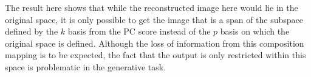 \documentclass[12pt]{article}
\begin{document}
The result here shows that while the reconstructed image here would lie in the original space, it is only possible to get the image that is a span of the subspace defined by the $k$ basis from the PC score instead of the $p$ basis on which the original space is defined. Although the loss of information from this composition mapping is to be expected, the fact that the output is only restricted within this space is problematic in the generative task.
\end{document}
